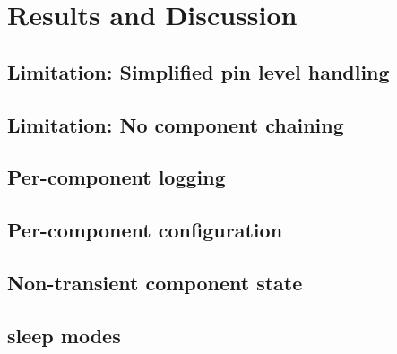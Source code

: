 
\chapter{Results and Discussion} \label{chapter:results}

\section{Limitation: Simplified pin level handling}


\section{Limitation: No component chaining}

\section{Per-component logging}
\section{Per-component configuration}


\section{Non-transient component state}


\section{\simavr sleep modes}


